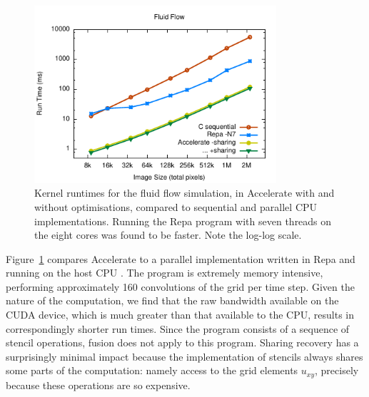 \begin{figure}
    \begin{center}
        \includegraphics[width=0.8\textwidth]{images/sec-6/fluid/fluid}
    \end{center}
    \caption[Fluid flow simulation kernel benchmarks]{Kernel runtimes for the
        fluid flow simulation, in Accelerate with and without optimisations,
        compared to sequential and parallel CPU implementations. Running the
        Repa program with seven threads on the eight cores was found to be
        faster. Note the log-log scale.
        }
    \label{fig:fluid}
\end{figure}

Figure~\ref{fig:fluid} compares Accelerate to a parallel implementation written
in Repa and running on the host CPU \cite{Lippmeier:2012gx}. The program is
extremely memory intensive, performing approximately 160 convolutions of the
grid per time step. Given the nature of the computation, we find that the raw
bandwidth available on the CUDA device, which is much greater than that
available to the CPU, results in correspondingly shorter run times. Since the
program consists of a sequence of stencil operations, fusion does not apply to
this program. Sharing recovery has a surprisingly minimal impact because the
implementation of stencils always shares some parts of the computation: namely
access to the grid elements $u_{xy}$, precisely because these operations are so
expensive.



